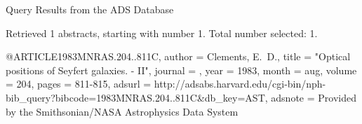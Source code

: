 Query Results from the ADS Database


Retrieved 1 abstracts, starting with number 1.  Total number selected: 1.

@ARTICLE{1983MNRAS.204..811C,
   author = {{Clements}, E.~D.},
    title = "{Optical positions of Seyfert galaxies. - II}",
  journal = {\mnras},
     year = 1983,
    month = aug,
   volume = 204,
    pages = {811-815},
   adsurl = {http://adsabs.harvard.edu/cgi-bin/nph-bib_query?bibcode=1983MNRAS.204..811C&db_key=AST},
  adsnote = {Provided by the Smithsonian/NASA Astrophysics Data System}
}


